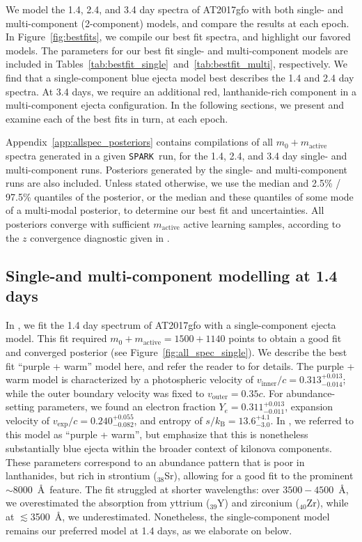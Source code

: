 \documentclass[twocolumn,twocolappendix]{aastex63}
\def\SPARK{\texttt{SPARK}}
\def\V23{\citetalias{vieira23}}
\begin{document}
We model the 1.4, 2.4, and 3.4 day spectra of AT2017gfo with both single- and multi-component (2-component) models, and compare the results at each epoch. In Figure~\ref{fig:bestfits}, we compile our best fit spectra, and highlight our favored models. The parameters for our best fit single- and multi-component models are included in Tables~\ref{tab:bestfit_single}~and~\ref{tab:bestfit_multi}, respectively. We find that a single-component blue ejecta model best describes the 1.4 and 2.4 day spectra. At 3.4 days, we require an additional red, lanthanide-rich component in a multi-component ejecta configuration. In the following sections, we present and examine each of the best fits in turn, at each epoch. 

Appendix~\ref{app:allspec_posteriors} contains compilations of all $m_0 + m_{\mathrm{active}}$ spectra generated in a given \SPARK~run, for the 1.4, 2.4, and 3.4 day single- and multi-component runs. Posteriors generated by the single- and multi-component runs are also included. Unless stated otherwise, we use the median and 2.5\% / 97.5\% quantiles of the posterior, or the median and these quantiles of some mode of a multi-modal posterior, to determine our best fit and uncertainties. All posteriors converge with sufficient $m_{\mathrm{active}}$ active learning samples, according to the $z$ convergence diagnostic given in \cite{fleming20}.




\subsection{Single-and multi-component modelling at 1.4 days}\label{ssc:1.4}

In \V23, we fit the 1.4 day spectrum of AT2017gfo with a single-component ejecta model. This fit required $m_0 + m_{\mathrm{active}} = 1500 + 1140$ points to obtain a good fit and converged posterior (see Figure~\ref{fig:all_spec_single}). We describe the best fit ``purple + warm'' model here, and refer the reader to \V23 for details. The purple + warm model is characterized by a photospheric velocity of $v_{\mathrm{inner}}/c = 0.313^{+0.013}_{-0.014}$; while the outer boundary velocity was fixed to $v_{\mathrm{outer}} = 0.35c$. For abundance-setting parameters, we found an electron fraction $Y_e = 0.311^{+0.013}_{-0.011}$, expansion velocity of $v_{\mathrm{exp}}/c = 0.240^{+0.055}_{-0.082}$, and entropy of $s / k_{\mathrm{B}} = 13.6^{+4.1}_{-3.0}$. In \V23, we referred to this model as ``purple + warm'', but emphasize that this is nonetheless substantially blue ejecta within the broader context of kilonova components. These parameters correspond to an abundance pattern that is poor in lanthanides, but rich in strontium (${}_{38}$Sr), allowing for a good fit to the prominent $\sim$8000~\AA~feature. The fit struggled at shorter wavelengths: over $3500-4500$~\AA, we overestimated the absorption from yttrium (${}_{39}$Y) and zirconium (${}_{40}$Zr), while at $\lesssim$3500~\AA, we underestimated. Nonetheless, the single-component model remains our preferred model at 1.4 days, as we elaborate on below.
\end{document}
